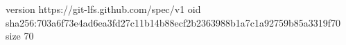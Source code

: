 version https://git-lfs.github.com/spec/v1
oid sha256:703a6f73e4ad6ea3fd27c11b14b88ecf2b2363988b1a7c1a92759b85a3319f70
size 70
